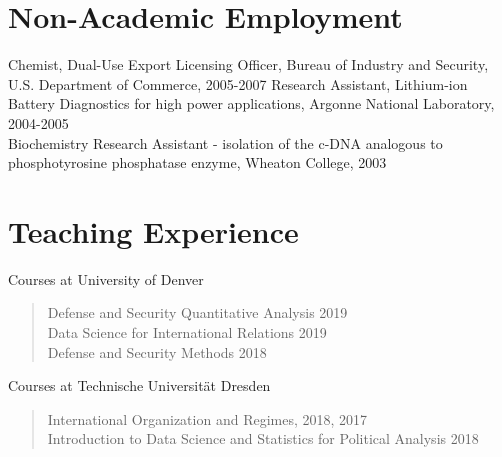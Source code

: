 \documentclass[margin, 10pt]{CVStyleTemplate}\usepackage[]{graphicx}\usepackage[]{color}
\begin{document}
\begin{resume}
\section{Non-Academic Employment}
%
Chemist, Dual-Use Export Licensing Officer, Bureau of Industry and Security, U.S. Department of Commerce, 2005-2007 %
%
Research Assistant, Lithium-ion Battery Diagnostics for high power applications, Argonne National Laboratory, 2004-2005\\[6pt]%
Biochemistry Research Assistant - isolation of the c-DNA analogous to phosphotyrosine phosphatase enzyme, Wheaton College, 2003 %

\section{Teaching Experience}

Courses at University of Denver
\begin{quotation} \noindent
Defense and Security Quantitative Analysis 2019 \\[6pt]
Data Science for International Relations 2019 \\[6pt]
Defense and Security Methods 2018 
\end{quotation}

Courses at Technische Universit\"{a}t Dresden
\begin{quotation} \noindent
International Organization and Regimes, 2018, 2017 \\[6pt] %
Introduction to Data Science and Statistics for Political Analysis 2018
\end{quotation}


\end{resume}
\end{document}
